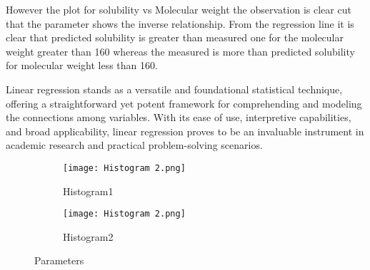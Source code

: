\documentclass[20pt]{article}
\begin{document}
However the plot for solubility vs Molecular weight the observation is clear cut that the parameter shows the inverse relationship. From the regression line it is clear that predicted solubility is greater than measured one for the molecular weight greater than 160 whereas the measured is more than predicted solubility for molecular weight less than 160. 

Linear regression stands as a versatile and foundational statistical technique, offering a straightforward yet potent framework for comprehending and modeling the connections among variables. With its ease of use, interpretive capabilities, and broad applicability, linear regression proves to be an invaluable instrument in academic research and practical problem-solving scenarios.


\begin{figure}
  \centering

  \begin{subfigure}[b]{0.4\textwidth}
    \texttt{[image: Histogram 2.png]}
    \caption{Histogram1}
  \end{subfigure}
  \hfill
  \begin{subfigure}[b]{0.4\textwidth}
    \texttt{[image: Histogram 2.png]}
    \caption{Histogram2}
  \end{subfigure}
  \caption{Parameters}
\end{figure}
\end{document}
